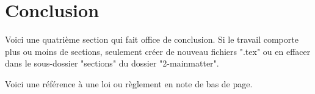 \section{Conclusion}

Voici une quatrième section qui fait office de conclusion. Si le travail comporte plus ou moins de sections, seulement créer de nouveau fichiers ".tex" ou en effacer dans le sous-dossier "sections" du dossier "2-mainmatter".

Voici une référence à une loi ou règlement en note de bas de page.\autocite{Pays/Etat2021}
